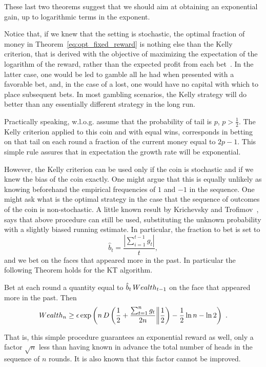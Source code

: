 These last two theorems suggest that we should aim at obtaining an exponential gain, up to logarithmic terms in the exponent.

Notice that, if we knew that the setting is stochastic, the optimal fraction of money in Theorem~\ref{eq:opt_fixed_reward} is nothing else than the Kelly criterion, that is derived with the objective of maximizing the expectation of the logarithm of the reward, rather than the expected profit from each bet~\citep{Kelly56}.
In the latter case, one would be led to gamble all he had when presented with a favorable bet, and, in the case of a lost, one would have no capital with which to place subsequent bets.
In most gambling scenarios, the Kelly strategy will do better than any essentially different strategy in the long run. %

Practically speaking, w.l.o.g. assume that the probability of tail is $p$, $p> \frac{1}{2}$.
The Kelly criterion applied to this coin and with equal wins, corresponds in betting on that tail on each round a fraction of the current money equal to $2p-1$. This simple rule assures that in expectation the growth rate will be exponential.

However, the Kelly criterion can be used only if the coin is stochastic and if we knew the bias of the coin exactly. One might argue that this is equally unlikely as knowing beforehand the empirical frequencies of $1$ and $-1$ in the sequence.
One might ask what is the optimal strategy in the case that the sequence of outcomes of the coin is non-stochastic.
A little known result by Krichevsky and Trofimov~\cite{KrichevskyT81}, says that above procedure can still be used, substituting the unknown probability with a slightly biased running estimate. In particular, the fraction to bet is set to
\[
\hat{b}_t=\frac{|\sum_{i=1}^{t-1} g_t|}{t},
\]
and we bet on the faces that appeared more in the past.
In particular the following Theorem holds for the \ac{KT} algorithm.
\begin{theorem}
Bet at each round a quantity equal to $\hat{b}_t \, Wealth_{t-1}$ on the face that appeared more in the past. Then
\begin{align*}
Wealth_{n}
\geq \epsilon \exp\left(n\, D\left(\frac{1}{2}+\frac{\sum_{t=1}^n g_t}{2 n}\middle\|\frac{1}{2}\right) - \frac{1}{2} \ln n - \ln 2\right)~.
\end{align*}
\end{theorem}
That is, this simple procedure guarantees an exponential reward as well, only a factor $\sqrt{n}$ less than having known in advance the total number of heads in the sequence of $n$ rounds. It is also known that this factor cannot be improved.

